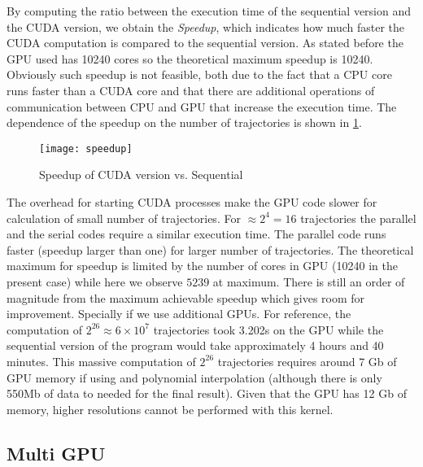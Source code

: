 
By computing the ratio between the execution time of the sequential version and the CUDA
version, we obtain the \emph{Speedup}, which indicates how much faster the CUDA computation is
compared to the sequential version. As stated before the GPU used has 10240 cores so the
theoretical maximum speedup is 10240. Obviously such speedup is not feasible, both due to the
fact that a CPU core runs faster than a CUDA core and that there are additional operations
of communication between CPU and GPU that increase the execution time.
The dependence of the speedup on the number of trajectories is shown in \cref{fig:speedup}.

\begin{figure}[H]
    \centering
    \texttt{[image: speedup]}
    \caption{Speedup of CUDA version vs. Sequential}%
    \label{fig:speedup}
\end{figure}

The overhead for starting CUDA processes make the GPU code slower for
calculation of small number of trajectories. For $\approx 2^4 = 16$ trajectories
the parallel and the serial codes require a similar execution time. The parallel
code runs faster (speedup larger than one) for larger number of trajectories.
The theoretical maximum for speedup is limited by the number of cores in GPU
(10240 in the present case) while here we observe $5239$ at maximum. There is
still an order of magnitude from the maximum achievable speedup which gives room
for improvement. Specially if we use additional GPUs. For reference, the
computation of $2^{26} \approx 6\times 10^7$ trajectories took 3.202s on the GPU
while the sequential version of the program would take approximately 4 hours and
40 minutes.  This massive computation of $2^{26}$ trajectories requires around 7
Gb of GPU memory if using and polynomial interpolation (although there is only
550Mb of data to needed for the final result). Given that the GPU has 12 Gb of
memory, higher resolutions cannot be performed with this kernel.

\subsection{Multi GPU}

